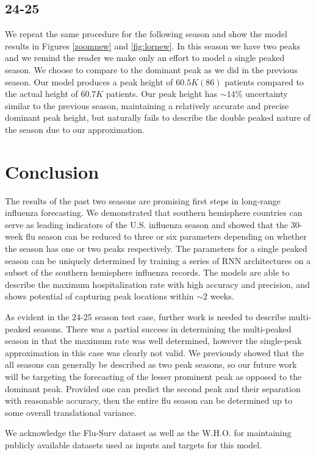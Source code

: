 \documentclass[12pt,a4paper,english]{article}
\begin{document}
\subsection{24-25}
We repeat the same procedure for the following season and show the model results in Figures \ref{zoomnew} and \ref{fig:lornew}. In this season we have two peaks and we remind the reader we make only an effort to model a single peaked season. We choose to compare to the dominant peak as we did in the previous season. Our model produces a peak height of $60.5K(86)$ patients compared to the actual height of $60.7K$ patients. Our peak height has $\sim 14\%$ uncertainty similar to the previous season, maintaining a relatively accurate and precise dominant peak height, but naturally fails to describe the double peaked nature of the season due to our approximation.

\section{Conclusion}

The results of the past two seasons are promising first steps in long-range influenza forecasting. We demonstrated that southern hemisphere countries can serve as leading indicators of the U.S. influenza season and showed that the 30-week flu season can be reduced to three or six parameters depending on whether the season has one or two peaks respectively. The parameters for a single peaked season can be uniquely determined by training a series of RNN architectures on a subset of the southern hemisphere influenza records. The models are able to describe the maximum hospitalization rate with high accuracy and precision, and shows potential of capturing peak locations within $\sim2$ weeks.

As evident in the 24-25 season test case, further work is needed to describe multi-peaked seasons. There was a partial success in determining the multi-peaked season in that the maximum rate was well determined, however the single-peak approximation in this case was clearly not valid. We previously showed that the all seasons can generally be described as two peak seasons, so our future work will be targeting the forecasting of the lesser prominent peak as opposed to the dominant peak. Provided one can predict the second peak and their separation with reasonable accuracy, then the entire flu season can be determined up to some overall translational variance.

We acknowledge the Flu-Surv dataset as well as the W.H.O. for maintaining publicly available datasets used as inputs and targets for this model. 
\end{document}
